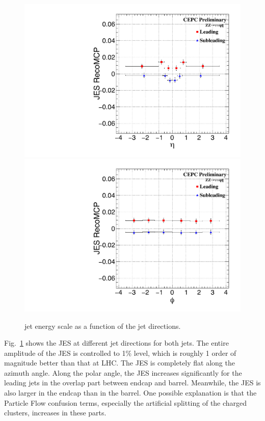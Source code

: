 \begin{figure}[h!]
\centering
\includegraphics[scale=0.30]{Figures/Performance/peizhu/ROOTFit_RecoMCP_VS_bin7.pdf}
\includegraphics[scale=0.30]{Figures/Performance/peizhu/ROOTFit_RecoMCP_VS_bin8.pdf}
\caption{jet energy scale as a function of the jet directions. }
\label{fig:jet-energy-scale}
\end{figure}
Fig.~\ref{fig:jet-energy-scale} shows the JES at different jet directions for both jets.
The entire amplitude of the JES is controlled to 1\% level,
which is roughly 1 order of magnitude better than that at LHC.
The JES is completely flat along the azimuth angle.
Along the polar angle, the JES increases significantly for the leading jets in the overlap part between endcap and barrel.
Meanwhile, the JES is also larger in the endcap than in the barrel.
One possible explanation is that the Particle Flow confusion terms,
especially the artificial splitting of the charged clusters, increases in these parts.
 
